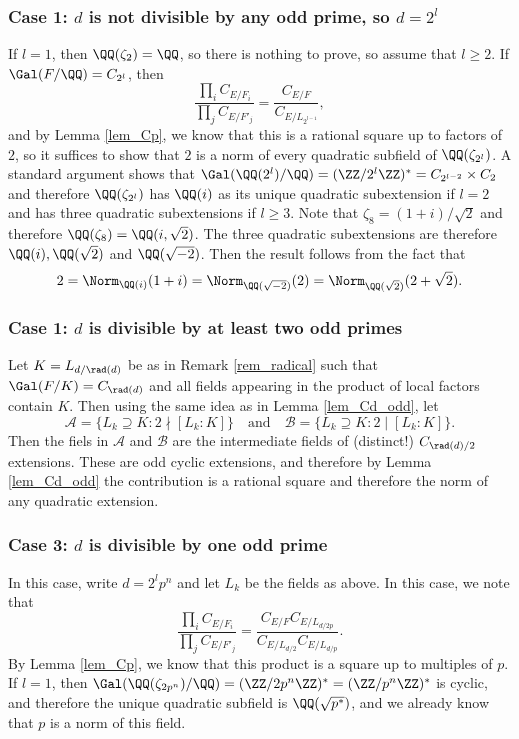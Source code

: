 \subsubsection*{Case 1: $d$ is not divisible by any odd prime, so $d=2^l$}
If $l=1$, then $\QQ(\zeta_2)=\QQ$, so there is nothing to prove, so assume that $l\geq2$. If $\Gal(F/\QQ)=C_{2^l}$, then 
$$\frac{\prod_i C_{E/F_i}}{\prod_j C_{E/F'_j}}=\frac{C_{E/F}}{C_{E/L_{2^{l-1}}}},$$
and by Lemma \ref*{lem_Cp}, we know that this is a rational square up to factors of $2$, so it suffices to show that $2$ is a norm of every quadratic subfield of $\QQ(\zeta_{2^l})$. A standard argument shows that $\Gal(\QQ(2^l)/\QQ)=(\ZZ/2^l\ZZ)^*=C_{2^{l-2}}\times C_2$ and therefore $\QQ(\zeta_{2^l})$ has $\QQ(i)$ as its unique quadratic subextension if $l=2$ and has three quadratic subextensions if $l\geq 3$. Note that $\zeta_8=(1+i)/\sqrt{2}$ and therefore $\QQ(\zeta_8)=\QQ(i,\sqrt{2})$. The three quadratic subextensions are therefore $\QQ(i), \QQ(\sqrt{2})$ and $\QQ(\sqrt{-2})$. Then the result follows from the fact that 
$$2=\Norm_{\QQ(i)}(1+i)=\Norm_{\QQ(\sqrt{-2})}(2)=\Norm_{\QQ(\sqrt{2})}(2+\sqrt{2}).$$

\subsubsection*{Case 1: $d$ is divisible by at least two odd primes}
Let $K=L_{d/\rad(d)}$ be as in Remark \ref*{rem_radical} such that $\Gal(F/K)=C_{\rad(d)}$ and all fields appearing in the product of local factors contain $K$. Then using the same idea as in Lemma \ref*{lem_Cd_odd}, let 
$$\mathcal{A}=\{L_k\supseteq K:2\nmid [L_k:K]\}\quad\text{and}\quad\mathcal{B}=\{L_k\supseteq K:2\mid [L_k:K]\}.$$
Then the fiels in $\mathcal{A}$ and $\mathcal{B}$ are the intermediate fields of (distinct!) $C_{\rad(d)/2}$ extensions. These are odd cyclic extensions, and therefore by Lemma \ref*{lem_Cd_odd} the contribution is a rational square and therefore the norm of any quadratic extension.

\subsubsection*{Case 3: $d$ is divisible by one odd prime}
In this case, write $d=2^lp^n$ and let $L_k$ be the fields as above. In this case, we note that 
$$\frac{\prod_i C_{E/F_i}}{\prod_j C_{E/F'_j}}=\frac{C_{E/F}C_{E/L_{d/2p}}}{C_{E/L_{d/2}}C_{E/L_{d/p}}}.$$
By Lemma \ref*{lem_Cp}, we know that this product is a square up to multiples of $p$. If $l=1$, then $\Gal(\QQ(\zeta_{2p^n})/\QQ)=(\ZZ/2p^n\ZZ)^*=(\ZZ/p^n\ZZ)^*$ is cyclic, and therefore the unique quadratic subfield is $\QQ(\sqrt{p^*})$, and we already know that $p$ is a norm of this field.

